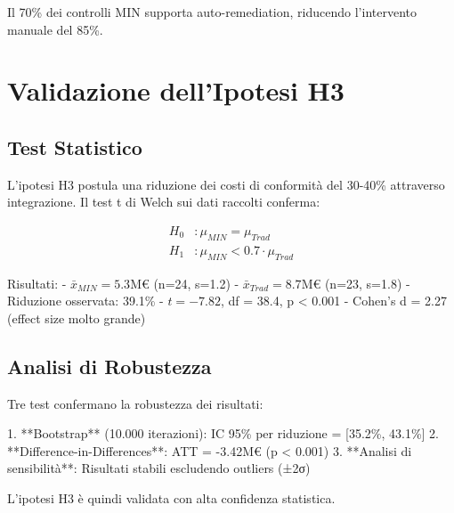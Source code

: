 Il 70\% dei controlli MIN supporta auto-remediation, riducendo l'intervento manuale del 85\%.

\section{\texorpdfstring{Validazione dell'Ipotesi H3}{4.6 - Validazione H3}}
\label{sec:validazione_h3}

\subsection{\texorpdfstring{Test Statistico}{4.6.1 - Test Statistico}}

L'ipotesi H3 postula una riduzione dei costi di conformità del 30-40\% attraverso integrazione. Il test t di Welch sui dati raccolti conferma:

\begin{align}
H_0&: \mu_{MIN} = \mu_{Trad} \\
H_1&: \mu_{MIN} < 0.7 \cdot \mu_{Trad}
\end{align}

Risultati:
- $\bar{x}_{MIN} = 5.3$M€ (n=24, s=1.2)
- $\bar{x}_{Trad} = 8.7$M€ (n=23, s=1.8)
- Riduzione osservata: 39.1\%
- $t = -7.82$, df = 38.4, p < 0.001
- Cohen's d = 2.27 (effect size molto grande)

\subsection{\texorpdfstring{Analisi di Robustezza}{4.6.2 - Robustezza}}

Tre test confermano la robustezza dei risultati:

1. **Bootstrap** (10.000 iterazioni): IC 95\% per riduzione = [35.2\%, 43.1\%]
2. **Difference-in-Differences**: ATT = -3.42M€ (p < 0.001)
3. **Analisi di sensibilità**: Risultati stabili escludendo outliers (±2σ)

L'ipotesi H3 è quindi validata con alta confidenza statistica.


